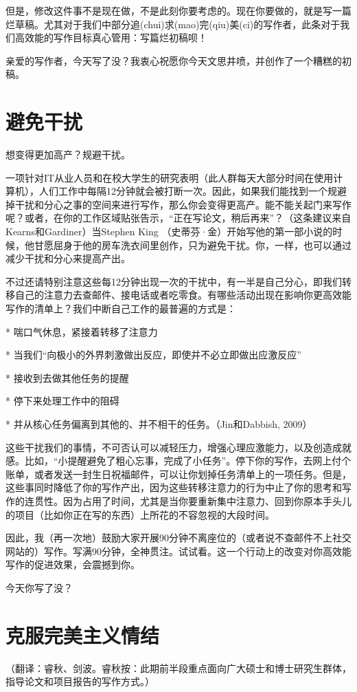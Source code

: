 \documentclass{ctexart}
\begin{document}
但是，修改这件事不是现在做，不是此刻你要考虑的。现在你要做的，就是写一篇烂草稿。尤其对于我们中部分追(chui)求(mao)完(qiu)美(ci)的写作者，此条对于我们高效能的写作目标真心管用：写篇烂初稿呗！

亲爱的写作者，今天写了没？我衷心祝愿你今天文思井喷，并创作了一个糟糕的初稿。

\section{避免干扰}
想变得更加高产？规避干扰。

一项针对IT从业人员和在校大学生的研究表明（此人群每天大部分时间在使用计算机），人们工作中每隔12分钟就会被打断一次。因此，如果我们能找到一个规避掉干扰和分心之事的空间来进行写作，那么你会变得更高产。能不能关起门来写作呢？或者，在你的工作区域贴张告示，“正在写论文，稍后再来”？（这条建议来自Kearns和Gardiner）当Stephen King （史蒂芬·金）开始写他的第一部小说的时候，他甘愿屈身于他的房车洗衣间里创作，只为避免干扰。你，一样，也可以通过减少干扰和分心来提高产出。

不过还请特别注意这些每12分钟出现一次的干扰中，有一半是自己分心，即我们转移自己的注意力去查邮件、接电话或者吃零食。有哪些活动出现在影响你更高效能写作的清单上？我们中断自己工作的最普遍的方式是：

* 喘口气休息，紧接着转移了注意力

* 当我们“向极小的外界刺激做出反应，即使并不必立即做出应激反应”

* 接收到去做其他任务的提醒

* 停下来处理工作中的阻碍

* 并从核心任务偏离到其他的、并不相干的任务。（Jin和Dabbish, 2009）

这些干扰我们的事情，不可否认可以减轻压力，增强心理应激能力，以及创造成就感。比如，“小提醒避免了粗心忘事，完成了小任务”。停下你的写作，去网上付个账单，或者发送一封生日祝福邮件，可以让你划掉任务清单上的一项任务。但是，这些事同时降低了你的写作产出，因为这些转移注意力的行为中止了你的思考和写作的连贯性。因为占用了时间，尤其是当你要重新集中注意力、回到你原本手头儿的项目（比如你正在写的东西）上所花的不容忽视的大段时间。

因此，我（再一次地）鼓励大家开展90分钟不离座位的（或者说不查邮件不上社交网站的）写作。写满90分钟，全神贯注。试试看。这一个行动上的改变对你高效能写作的促进效果，会震撼到你。

今天你写了没？

\section{克服完美主义情结}
（翻译：睿秋、剑波。睿秋按：此期前半段重点面向广大硕士和博士研究生群体，指导论文和项目报告的写作方式。）
\end{document}
